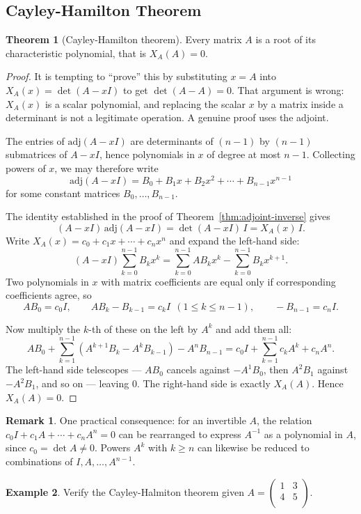 \documentclass[11pt,a4paper]{article}
\theoremstyle{definition}
\newtheorem{thm}{Theorem}[subsection]
\newtheorem{exa}[thm]{Example}
\newtheorem*{remark}{Remark}
\begin{document}
\subsection{Cayley-Hamilton Theorem}
\begin{thm}[Cayley-Hamilton theorem]\label{thm:cayley-hamilton}
Every matrix $A$ is a root of its characteristic polynomial, that is
$X_A(A)=0$.
\end{thm}

\begin{proof}
It is tempting to ``prove'' this by substituting $x=A$ into $X_A(x)=\det(A-xI)$
to get $\det(A-A)=0$. That argument is wrong: $X_A(x)$ is a scalar polynomial,
and replacing the scalar $x$ by a matrix inside a determinant is not a
legitimate operation. A genuine proof uses the adjoint.

The entries of $\text{adj}(A-xI)$ are determinants of $(n-1)$ by $(n-1)$
submatrices of $A-xI$, hence polynomials in $x$ of degree at most $n-1$.
Collecting powers of $x$, we may therefore write
$$\text{adj}(A-xI)=B_0+B_1x+B_2x^2+\cdots+B_{n-1}x^{n-1}$$
for some constant matrices $B_0,\dots,B_{n-1}$.

The identity established in the proof of Theorem~\ref{thm:adjoint-inverse}
gives
$$(A-xI)\,\text{adj}(A-xI)=\det(A-xI)\,I=X_A(x)\,I.$$
Write $X_A(x)=c_0+c_1x+\cdots+c_nx^n$ and expand the left-hand side:
$$(A-xI)\sum_{k=0}^{n-1}B_kx^k
=\sum_{k=0}^{n-1}AB_kx^k-\sum_{k=0}^{n-1}B_kx^{k+1}.$$
Two polynomials in $x$ with matrix coefficients are equal only if
corresponding coefficients agree, so
$$AB_0=c_0I,\qquad AB_k-B_{k-1}=c_kI \ \ (1\leq k\leq n-1),\qquad
-B_{n-1}=c_nI.$$

Now multiply the $k$-th of these on the left by $A^k$ and add them all:
$$AB_0+\sum_{k=1}^{n-1}\left(A^{k+1}B_k-A^kB_{k-1}\right)-A^nB_{n-1}
=c_0I+\sum_{k=1}^{n-1}c_kA^k+c_nA^n.$$
The left-hand side telescopes --- $AB_0$ cancels against $-A^1B_0$, then
$A^2B_1$ against $-A^2B_1$, and so on --- leaving $0$. The right-hand side is
exactly $X_A(A)$. Hence $X_A(A)=0$.
\end{proof}

\begin{remark}
One practical consequence: for an invertible $A$, the relation
$c_0I+c_1A+\cdots+c_nA^n=0$ can be rearranged to express $A^{-1}$ as a
polynomial in $A$, since $c_0=\det A\neq 0$. Powers $A^k$ with $k\geq n$ can
likewise be reduced to combinations of $I,A,\dots,A^{n-1}$.
\end{remark}


\begin{exa}
Verify the Cayley-Halmiton theorem given $A=
\begin{pmatrix}
1&3\\4&5\\
\end{pmatrix}
$.
\end{exa}
\end{document}
